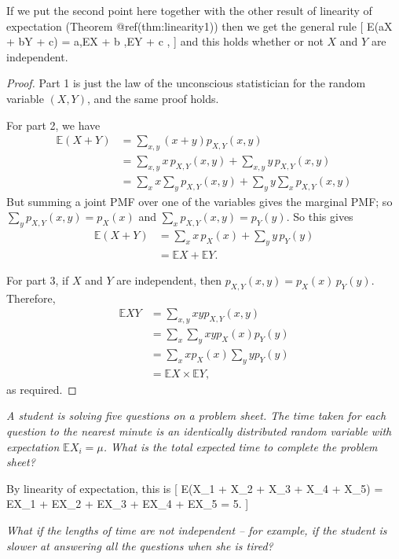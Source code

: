 \documentclass[
  letterpaper,
]{report}
\theoremstyle{definition}
\theoremstyle{definition}
\theoremstyle{remark}
\begin{document}
If we put the second point here together with the other result of
linearity of expectation (Theorem @ref(thm:linearity1)) then we get the
general rule {[} \mathbb E(aX + bY + c) = a,\mathbb EX + b ,\mathbb EY +
c , {]} and this holds whether or not \(X\) and \(Y\) are independent.

\begin{proof}

Part 1 is just the law of the unconscious statistician for the random
variable \((X,Y)\), and the same proof holds.

For part 2, we have \begin{align*}
\mathbb E(X + Y) &= \sum_{x,y} (x + y)p_{X,Y}(x,y) \\
  &= \sum_{x,y} x\,p_{X,Y}(x,y) + \sum_{x,y} y\,p_{X,Y}(x,y) \\
  &= \sum_x x \sum_y p_{X,Y}(x,y) + \sum_y y \sum_x p_{X,Y}(x,y)
\end{align*} But summing a joint PMF over one of the variables gives the
marginal PMF; so \(\sum_y p_{X,Y}(x,y) = p_X(x)\) and
\(\sum_x p_{X,Y}(x,y) = p_Y(y)\). So this gives \begin{align*}
\mathbb E(X + Y) &= \sum_x x\, p_X(x) + \sum_y y\,p_Y(y) \\
&= \mathbb EX + \mathbb EY .
\end{align*}

For part 3, if \(X\) and \(Y\) are independent, then
\(p_{X,Y}(x,y) = p_X(x) \, p_Y(y)\). Therefore, \begin{align*}
\mathbb EXY &= \sum_{x,y} xy p_{X,Y}(x,y) \\
  &= \sum_x \sum_y xy p_X(x) p_Y(y) \\
  &= \sum_x x p_X(x) \sum_y y p_Y(y) \\
  &= \mathbb EX \times \mathbb EY,
\end{align*} as required.

\end{proof}

\emph{A student is solving five questions on a problem sheet. The time
taken for each question to the nearest minute is an identically
distributed random variable with expectation \(\mathbb EX_i = \mu\).
What is the total expected time to complete the problem sheet?}

By linearity of expectation, this is {[} \mathbb E(X\_1 + X\_2 + X\_3 +
X\_4 + X\_5) = \mathbb EX\_1 + \mathbb EX\_2 + \mathbb EX\_3 +
\mathbb EX\_4 + \mathbb EX\_5 = 5\mu . {]}

\emph{What if the lengths of time are not independent -- for example, if
the student is slower at answering all the questions when she is tired?}
\end{document}
